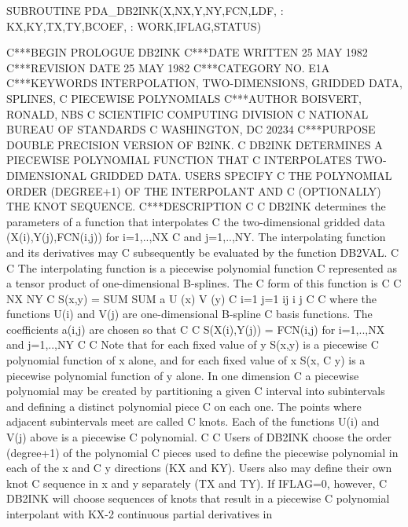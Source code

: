 \documentclass[11pt,twoside,nolof]{starlink}
\begin{document}
\begin{terminalv}
      SUBROUTINE PDA_DB2INK(X,NX,Y,NY,FCN,LDF,
     :                      KX,KY,TX,TY,BCOEF,
     :                      WORK,IFLAG,STATUS)

C***BEGIN PROLOGUE  DB2INK
C***DATE WRITTEN   25 MAY 1982
C***REVISION DATE  25 MAY 1982
C***CATEGORY NO.  E1A
C***KEYWORDS  INTERPOLATION, TWO-DIMENSIONS, GRIDDED DATA, SPLINES,
C             PIECEWISE POLYNOMIALS
C***AUTHOR  BOISVERT, RONALD, NBS
C             SCIENTIFIC COMPUTING DIVISION
C             NATIONAL BUREAU OF STANDARDS
C             WASHINGTON, DC 20234
C***PURPOSE  DOUBLE PRECISION VERSION OF B2INK.
C            DB2INK DETERMINES A PIECEWISE POLYNOMIAL FUNCTION THAT
C            INTERPOLATES TWO-DIMENSIONAL GRIDDED DATA. USERS SPECIFY
C            THE POLYNOMIAL ORDER (DEGREE+1) OF THE INTERPOLANT AND
C            (OPTIONALLY) THE KNOT SEQUENCE.
C***DESCRIPTION
C
C   DB2INK determines the parameters of a  function  that  interpolates
C   the two-dimensional gridded data (X(i),Y(j),FCN(i,j)) for i=1,..,NX
C   and j=1,..,NY. The interpolating function and its  derivatives  may
C   subsequently be evaluated by the function DB2VAL.
C
C   The interpolating  function  is  a  piecewise  polynomial  function
C   represented as a tensor product of one-dimensional  B-splines.  The
C   form of this function is
C
C                          NX   NY
C              S(x,y)  =  SUM  SUM  a   U (x) V (y)
C                         i=1  j=1   ij  i     j
C
C   where the functions U(i)  and  V(j)  are  one-dimensional  B-spline
C   basis functions. The coefficients a(i,j) are chosen so that
C
C         S(X(i),Y(j)) = FCN(i,j)   for i=1,..,NX and j=1,..,NY
C
C   Note that  for  each  fixed  value  of  y  S(x,y)  is  a  piecewise
C   polynomial function of x alone, and for each fixed value of x  S(x,
C   y) is a piecewise polynomial function of y alone. In one  dimension
C   a piecewise polynomial may  be  created  by  partitioning  a  given
C   interval into subintervals and defining a distinct polynomial piece
C   on each one. The points where adjacent subintervals meet are called
C   knots. Each of the functions U(i) and V(j)  above  is  a  piecewise
C   polynomial.
C
C   Users of DB2INK choose  the  order  (degree+1)  of  the  polynomial
C   pieces used to define the piecewise polynomial in each of the x and
C   y directions (KX and KY). Users also  may  define  their  own  knot
C   sequence in x and y separately (TX and TY).  If  IFLAG=0,  however,
C   DB2INK will choose sequences of knots that result  in  a  piecewise
C   polynomial interpolant with KX-2 continuous partial derivatives  in

\end{terminalv}
\end{document}
